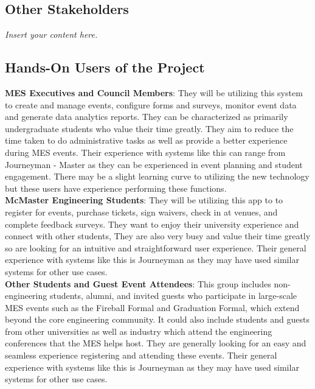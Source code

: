 \documentclass[12pt]{article}
\newcommand{\lips}{\textit{Insert your content here.}}
\begin{document}
\subsection{Other Stakeholders}
\lips
\subsection{Hands-On Users of the Project}
\textbf{MES Executives and Council Members}: They will be utilizing this system to create and manage events, configure forms and surveys, monitor event data and generate data analytics reports. They can be characterized as primarily undergraduate students who value their time greatly. They aim to reduce the time taken to do administrative tasks as well as provide a better experience during MES events. Their experience with systems like this can range from Journeyman - Master as they can be experienced in event planning and student engagement. There may be a slight learning curve to utilizing the new technology but these users have experience performing these functions.\\
\newline
\textbf{McMaster Engineering Students}: They will be utilizing this app to to register for events, purchase tickets, sign waivers, check in at venues, and complete feedback surveys. They want to enjoy their university experience and connect with other students, They are also very busy and value their time greatly so are looking for an intuitive and straightforward user experience. Their general experience with systems like this is Journeyman as they may have used similar systems for other use cases. \\
\newline
\textbf{Other Students and Guest Event Attendees}: This group includes non-engineering students, alumni, and invited guests who participate in large-scale MES events such as the Fireball Formal and Graduation Formal, which extend beyond the core engineering community. It could also include students and guests from other universities as well as industry which attend the engineering conferences that the MES helps host. They are generally looking for an easy and seamless experience registering and attending these events. Their general experience with systems like this is Journeyman as they may have used similar systems for other use cases.
\end{document}
